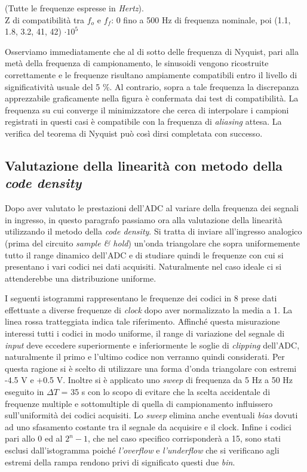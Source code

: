 \documentclass[journal]{IEEEtran}
\begin{document}
(Tutte le frequenze espresse in \textit{Hertz}). \\ Z di compatibilità tra $f_o$ e $f_f$: 0 fino a 500 Hz di frequenza nominale, poi (1.1, 1.8, 3.2, 41, 42) $\cdot 10^5$
\\
\vspace{5 mm}

Osserviamo immediatamente che al di sotto delle frequenza di Nyquist, pari alla metà della frequenza di campionamento, le sinusoidi vengono ricostruite correttamente e le frequenze risultano ampiamente compatibili entro il livello di significatività usuale del 5 \%. Al contrario, sopra a tale frequenza la discrepanza apprezzabile graficamente nella figura è confermata dai test di compatibilità. La frequenza su cui converge il minimizzatore che cerca di interpolare i campioni registrati in questi casi è compatibile con la frequenza di \textit{aliasing} attesa. La verifica del teorema di Nyquist può così dirsi completata con successo.


\subsection{Valutazione della linearità con metodo della \textit{code density}}
Dopo aver valutato le prestazioni dell'ADC al variare della frequenza dei segnali in ingresso, in questo paragrafo passiamo ora alla valutazione della linearità utilizzando il metodo della \textit{code density}. Si tratta di inviare all'ingresso analogico (prima del circuito \textit{sample \& hold}) un'onda triangolare che sopra uniformemente tutto il range dinamico dell'ADC e di studiare quindi le frequenze con cui si presentano i vari codici nei dati acquisiti. Naturalmente nel caso ideale ci si attenderebbe una distribuzione uniforme.

I seguenti istogrammi rappresentano le frequenze dei codici in 8 prese dati effettuate a diverse frequenze di \textit{clock} dopo aver normalizzato la media a 1. La linea rossa tratteggiata indica tale riferimento.
Affinché questa misurazione interessi tutti i codici in modo uniforme, il range di variazione del segnale di \textit{input} deve eccedere superiormente e inferiormente le soglie di \textit{clipping} dell'ADC, naturalmente il primo e l'ultimo codice non verranno quindi considerati. Per questa ragione si è scelto di utilizzare una forma d'onda triangolare con estremi -4.5 V e +0.5 V. Inoltre si è applicato uno \textit{sweep} di frequenza da 5 Hz a 50 Hz eseguito in $\Delta T$ = 35 s
con lo scopo di evitare che la scelta accidentale di frequenze multiple e sottomultiple di quella di campionamento influissero sull'uniformità dei codici acquisiti. Lo \textit{sweep} elimina anche eventuali \textit{bias} dovuti ad uno sfasamento costante tra il segnale da acquisire e il clock.
Infine i codici pari allo 0 ed al $2^n - 1$, che nel caso specifico corrisponderà a 15, sono stati esclusi dall'istogramma poiché \textit{l'overflow} e \textit{l'underflow} che si verificano agli estremi della rampa rendono privi di significato questi due \textit{bin}.
\end{document}
